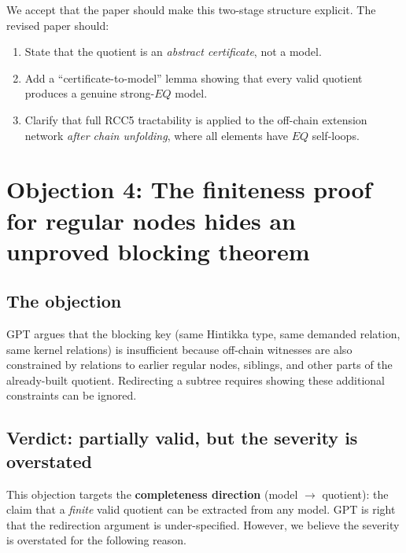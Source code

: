 \documentclass[11pt]{article}
\newcommand{\EQ}{\mathit{EQ}}
\begin{document}
We accept that the paper should make this two-stage structure explicit.
The revised paper should:
\begin{enumerate}
\item State that the quotient is an \emph{abstract certificate}, not a model.
\item Add a ``certificate-to-model'' lemma showing that every valid
  quotient produces a genuine strong-$\EQ$ model.
\item Clarify that full RCC5 tractability is applied to the off-chain
  extension network \emph{after chain unfolding}, where all elements have
  $\EQ$ self-loops.
\end{enumerate}

\section{Objection 4: The finiteness proof for regular nodes hides an unproved blocking theorem}

\subsection{The objection}

GPT argues that the blocking key (same Hintikka type, same demanded
relation, same kernel relations) is insufficient because off-chain
witnesses are also constrained by relations to earlier regular nodes,
siblings, and other parts of the already-built quotient.  Redirecting a
subtree requires showing these additional constraints can be ignored.

\subsection{Verdict: partially valid, but the severity is overstated}

This objection targets the \textbf{completeness direction} (model $\to$
quotient): the claim that a \emph{finite} valid quotient can be extracted
from any model.  GPT is right that the redirection argument is
under-specified.  However, we believe the severity is overstated for the
following reason.
\end{document}
